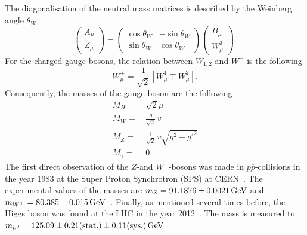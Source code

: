 The diagonalisation of the neutral mass matrices is described by the Weinberg angle $\theta_W$
\begin{equation}
 \begin{pmatrix} A_{\mu} \\ Z_{\mu} \end{pmatrix} = 
   \begin{pmatrix} \cos \theta_W & - \sin \theta_W \\ \sin \theta_W  & \cos \theta_W \end{pmatrix} \begin{pmatrix} B_{\mu} \\ W^3_{\mu} \end{pmatrix}.
\end{equation}
For the charged gauge bosons, the relation between $W_{1,2}$ and $W^{\pm}$ is the following
\begin{equation}
 W_{\mu}^{\pm}= \frac{1}{\sqrt{2}} \left[ W_{\mu}^1 \mp W_{\mu}^2  \right].
\end{equation}
Consequently, the masses of the gauge boson are the following
\begin{equation}
 \begin{split}
  M_H =\,&  \sqrt{2} \mu\\
  M_W =\,& \frac{g}{\sqrt{2}}\, v\\
  M_Z =\,& \frac{1}{\sqrt{2}}\, v \sqrt{g^2 + g'^2}\\
  M_{\gamma} =\,& 0.
 \end{split}
\end{equation}
The first direct observation of the $Z$-and $W^{\pm}$-bosons was made in $p\overline{p}$-collisions in the year 1983 at the Super Proton Synchrotron (SPS) at CERN~\cite{bib:W_discovery,bib:Z_discovery}.
The experimental values of the masses are $m_{Z}=91.1876\pm0.0021\,\text{Ge}\kern-0.06667em\text{V}$ and $m_{W^{\pm}}=80.385\pm0.015\,\text{Ge}\kern-0.06667em\text{V}$~\cite{bib:PDG_2014}.
Finally, as mentioned several times before, the Higgs boson was found at the LHC in the year 2012~\cite{bib:Theory:CMS:HiggsObservation,bib:Theory:Atlas:HiggsObservation}.
The mass is measured to $m_{h^0}=125.09 \pm 0.21\text{(stat.)} \pm 0.11\text{(sys.)}\,\text{Ge}\kern-0.06667em\text{V}$~\cite{bib:HiggsMass}.

